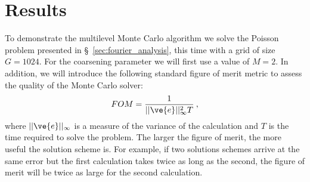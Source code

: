 \documentclass[note]{TechNote}
\begin{document}
\section{Results}
\label{sec:results}
To demonstrate the multilevel Monte Carlo algorithm we solve the
Poisson problem presented in \S~\ref{sec:fourier_analysis}, this time
with a grid of size $G = 1024$. For the coarsening parameter we will
first use a value of $M = 2$. In addition, we will introduce the
following standard figure of merit metric to assess the quality of the
Monte Carlo solver:
\begin{equation}
  FOM = \frac{1}{||\ve{e}||^2_{\infty} T}\:,
  \label{eq:figure_of_merit}
\end{equation}
where $||\ve{e}||_{\infty}$ is a measure of the variance of the
calculation and $T$ is the time required to solve the problem. The
larger the figure of merit, the more useful the solution scheme
is. For example, if two solutions schemes arrive at the same error but
the first calculation takes twice as long as the second, the figure of
merit will be twice as large for the second calculation.
\end{document}
